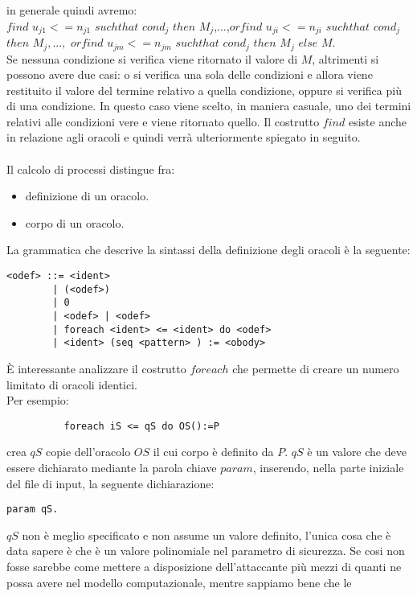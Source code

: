 \documentclass[a4paper,openright,twoside,12pt]{report}
\begin{document}
in generale quindi avremo:\\
$find$ $u_{j1}<=n_{j1}$ $suchthat$ $cond_j$ $then$ $M_j$,...,$orfind$ $u_{ji}<=n_{ji}$ $suchthat$ $cond_j$ $then$ $M_j,...,$ $orfind$ $u_{jm}<=n_{jm}$ $suchthat$ $cond_j$ $then$ $M_j$ $else$ $M$.
\\Se nessuna condizione si verifica viene ritornato il valore di $M$, altrimenti si possono avere due casi: o si verifica una sola delle condizioni e allora viene restituito il valore del termine
relativo a quella condizione, oppure si verifica pi\`u di una condizione. In questo caso viene scelto, in maniera casuale, uno dei termini relativi alle condizioni vere e viene ritornato quello. 
Il costrutto $find$ esiste anche in relazione agli oracoli e quindi verr\`a ulteriormente spiegato in seguito.
\\
\\
Il calcolo di processi distingue fra:
\begin{itemize}
 \item definizione di un oracolo.
 \item corpo di un oracolo.
\end{itemize}
La grammatica che descrive la sintassi della definizione degli oracoli \`e la seguente:
\begin{verbatim}
<odef> ::= <ident>
        | (<odef>)
        | 0
        | <odef> | <odef>
        | foreach <ident> <= <ident> do <odef>
        | <ident> (seq <pattern> ) := <obody>
\end{verbatim} 
\`E interessante analizzare il costrutto $foreach$ che permette di creare un numero limitato di oracoli identici. \\
Per esempio: \begin{center}
		\begin{verbatim}
		  foreach iS <= qS do OS():=P
		\end{verbatim}
	      \end{center}
crea $qS$ copie dell'oracolo $OS$ il cui corpo \`e definito da $P$. $qS$ \`e un valore che deve essere dichiarato mediante la parola chiave $param$, 
inserendo, nella parte iniziale del file di input, la seguente dichiarazione:
\begin{verbatim}
param qS. 
\end{verbatim}
$qS$ non \`e meglio specificato e non assume un valore definito, l'unica cosa che \`e data sapere \`e che \`e un valore polinomiale nel parametro di sicurezza.
Se cosi non fosse sarebbe come mettere a disposizione dell'attaccante pi\`u mezzi di quanti ne possa avere nel modello computazionale, mentre sappiamo bene che le
\end{document}

